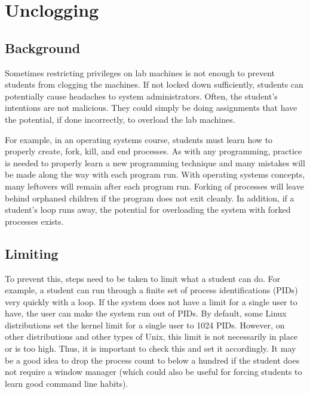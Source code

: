 \section{Unclogging}\label{sec:unclogging}
\subsection{Background}
Sometimes restricting privileges on lab machines is not enough to prevent students from clogging the machines.  If not locked down sufficiently, students can potentially cause headaches to system administrators.  Often, the student's intentions are not malicious.  They could simply be doing assignments that have the potential, if done incorrectly, to overload the lab machines.

For example, in an operating systems course, students must learn how to properly create, fork, kill, and end processes.  As with any programming, practice is needed to properly learn a new programming technique and many mistakes will be made along the way with each program run.  With operating systems concepts, many leftovers will remain after each program run.  Forking of processes will leave behind orphaned children if the program does not exit cleanly.  In addition, if a student's loop runs away, the potential for overloading the system with forked processes exists.  
\subsection{Limiting}
To prevent this, steps need to be taken to limit what a student can do.  For example, a student can run through a finite set of process identifications (PIDs) very quickly with a loop.  If the system does not have a limit for a single user to have, the user can make the system run out of PIDs.  By default, some Linux distributions set the kernel limit for a single user to 1024 PIDs.  However, on other distributions and other types of Unix, this limit is not necessarily in place or is too high.  Thus, it is important to check this and set it accordingly.  It may be a good idea to drop the process count to below a hundred if the student does not require a window manager (which could also be useful for forcing students to learn good command line habits).  

